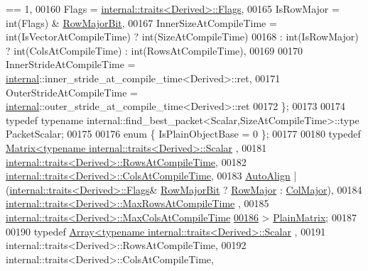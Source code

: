 \begin{DoxyCode}
       == 1,
00160       Flags = \hyperlink{struct_eigen_1_1internal_1_1traits}{internal::traits<Derived>::Flags},
00165       IsRowMajor = int(Flags) & \hyperlink{group__flags_gae4f56c2a60bbe4bd2e44c5b19cbe8762}{RowMajorBit}, 
00167       InnerSizeAtCompileTime = int(IsVectorAtCompileTime) ? int(SizeAtCompileTime)
00168                              : int(IsRowMajor) ? int(ColsAtCompileTime) : int(RowsAtCompileTime),
00169 
00170       InnerStrideAtCompileTime = \hyperlink{namespaceinternal}{internal}::inner\_stride\_at\_compile\_time<Derived>::ret,
00171       OuterStrideAtCompileTime = \hyperlink{namespaceinternal}{internal}::outer\_stride\_at\_compile\_time<Derived>::ret
00172     \};
00173     
00174     \textcolor{keyword}{typedef} \textcolor{keyword}{typename} internal::find\_best\_packet<Scalar,SizeAtCompileTime>::type PacketScalar;
00175 
00176     \textcolor{keyword}{enum} \{ IsPlainObjectBase = 0 \};
00177     
00180     \textcolor{keyword}{typedef} \hyperlink{group___core___module_class_eigen_1_1_matrix}{Matrix<typename internal::traits<Derived>::Scalar}
      ,
00181                 \hyperlink{struct_eigen_1_1internal_1_1traits}{internal::traits<Derived>::RowsAtCompileTime},
00182                 \hyperlink{struct_eigen_1_1internal_1_1traits}{internal::traits<Derived>::ColsAtCompileTime},
00183                 \hyperlink{group__enums_ggaacded1a18ae58b0f554751f6cdf9eb13a28d63c0dd8560827162decfd898804f4}{AutoAlign} | (\hyperlink{struct_eigen_1_1internal_1_1traits}{internal::traits<Derived>::Flags}&
      \hyperlink{group__flags_gae4f56c2a60bbe4bd2e44c5b19cbe8762}{RowMajorBit} ? \hyperlink{group__enums_ggaacded1a18ae58b0f554751f6cdf9eb13acfcde9cd8677c5f7caf6bd603666aae3}{RowMajor} : \hyperlink{group__enums_ggaacded1a18ae58b0f554751f6cdf9eb13a0cbd4bdd0abcfc0224c5fcb5e4f6669a}{ColMajor}),
00184                 \hyperlink{struct_eigen_1_1internal_1_1traits}{internal::traits<Derived>::MaxRowsAtCompileTime}
      ,
00185                 \hyperlink{struct_eigen_1_1internal_1_1traits}{internal::traits<Derived>::MaxColsAtCompileTime}
\hyperlink{group___core___module_ad8de067878e23967ce8a25cbd277f153}{00186}           > \hyperlink{group___core___module_class_eigen_1_1_matrix}{PlainMatrix};
00187     
00190     \textcolor{keyword}{typedef} \hyperlink{group___core___module_class_eigen_1_1_array}{Array<typename internal::traits<Derived>::Scalar}
      ,
00191                 internal::traits<Derived>::RowsAtCompileTime,
00192                 internal::traits<Derived>::ColsAtCompileTime,

\end{DoxyCode}
